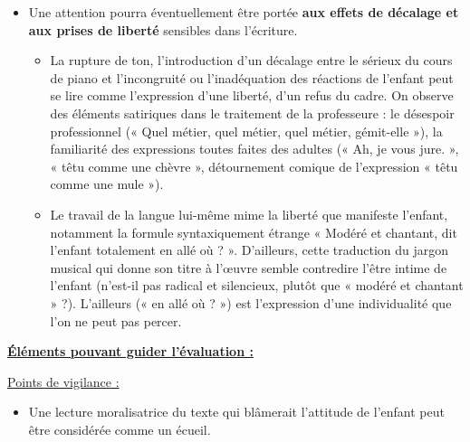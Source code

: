{\begin{itemize}[label=\textbullet]
\begin{itemize}
\item L’échappée vers le décor en mouvement, qui pourrait s’entendre comme une
forme de contagion, voire d’ivresse (cf. la métaphore « la vedette lui passait
dans le sang »). L’enfant est traversé par le bruit et la vitesse du monde qui
l’entoure.

\item La communion à distance avec d’autres enfants (« D’autres enfants, ailleurs,
sur les quais, arrêtés »). La révolte de l’enfant serait plus largement celle de
l’enfance contre l’âge adulte.
\end{itemize}

\item Une attention pourra éventuellement être portée \textbf{aux effets de décalage et aux prises de liberté} sensibles dans l’écriture.

\begin{itemize}
\item La rupture de ton, l’introduction d’un décalage entre le sérieux du cours de piano
et l’incongruité ou l’inadéquation des réactions de l’enfant peut se lire comme
l’expression d’une liberté, d’un refus du cadre. On observe des éléments
satiriques dans le traitement de la professeure : le désespoir professionnel
(« Quel métier, quel métier, quel métier, gémit-elle »), la familiarité des
expressions toutes faites des adultes (« Ah, je vous jure. », « têtu comme une
chèvre », détournement comique de l’expression « têtu comme une mule »).

\item Le travail de la langue lui-même mime la liberté que manifeste l’enfant,
notamment la formule syntaxiquement étrange « Modéré et chantant, dit
l’enfant totalement en allé où ? ». D’ailleurs, cette traduction du jargon musical
qui donne son titre à l’œuvre semble contredire l’être intime de l’enfant (n’est-il
pas radical et silencieux, plutôt que « modéré et chantant » ?). L’ailleurs (« en
allé où ? ») est l’expression d’une individualité que l’on ne peut pas percer.
\end{itemize}
\end{itemize}

\textbf{\underline{Éléments pouvant guider l’évaluation :}}

\underline{Points de vigilance :}

\begin{itemize}
\item Une lecture moralisatrice du texte qui blâmerait l’attitude de l’enfant peut être
considérée comme un écueil.
\end{itemize}		

}
